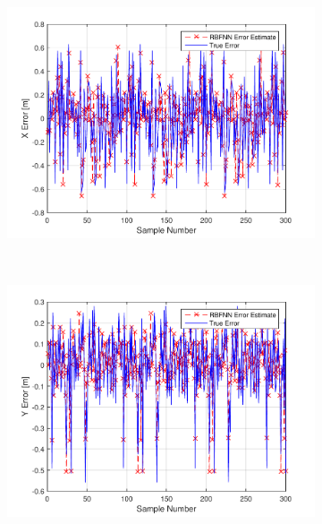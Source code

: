\begin{figure}
  \begin{subfigure}{0.3\textwidth}
    \includegraphics[width=\textwidth]{figures/chapter4/x_train}
    \caption{}
  \end{subfigure}
~
  \begin{subfigure}{0.3\textwidth}
    \includegraphics[width=\textwidth]{figures/chapter4/y_train}
    \caption{}
  \end{subfigure}
~
  \begin{subfigure}{0.3\textwidth}

\end{subfigure}
\end{figure}
